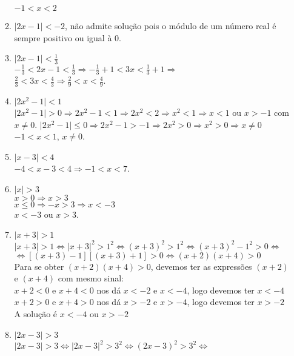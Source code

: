 \documentclass[10pt]{book}
\begin{document}
\begin{enumerate}
\begin{enumerate}
		$-1 < x < 2$
		\item %
		$\vert 2x - 1 \vert < -2$, não admite solução pois o módulo de um número real é sempre positivo ou igual à 0.
		\item %
		$\vert 2x - 1 \vert < \frac{1}{3}$\\
		$-\frac{1}{3} < 2x - 1 < \frac{1}{3} \Rightarrow -\frac{1}{3} + 1 < 3x < \frac{1}{3} + 1 \Rightarrow$\\
		$\frac{2}{3} < 3x < \frac{4}{3} \Rightarrow \frac{2}{9} < x < \frac{4}{9}$.
		\item %
		$\vert 2x^2 - 1 \vert < 1$\\
		$\vert 2x^2 - 1 \vert > 0 \Rightarrow 2x^2 - 1 < 1 \Rightarrow 2x^2 < 2 \Rightarrow x^2 < 1 \Rightarrow x < 1$ ou $x > -1$ com $x \neq 0$.
		$\vert 2x^2 - 1 \vert \leq 0 \Rightarrow 2x^2 - 1 > -1 \Rightarrow 2x^2 > 0 \Rightarrow x^2 > 0 \Rightarrow x \neq 0$\\
		$-1 < x < 1$, $x \neq 0$.
		\item %
		$\vert x - 3 \vert < 4$\\
		$-4 <  x - 3 < 4 \Rightarrow -1 < x < 7$.
		\item %
		$\vert x \vert > 3$\\		
		$x > 0 \Rightarrow x > 3$\\
		$x \leq 0 \Rightarrow -x > 3 \Rightarrow x < -3$\\
		$x < -3$ ou $x > 3$.
		\item %
		$\vert x + 3 \vert > 1$\\
		$\vert x + 3 \vert > 1 \Leftrightarrow \vert x + 3\vert^2 > 1^2  \Leftrightarrow (x+3)^2 > 1^2 \Leftrightarrow (x+3)^2 - 1^2 > 0 \Leftrightarrow$\\
		$\Leftrightarrow [(x+3)-1][(x+3)+1]>0 \Leftrightarrow (x+2)(x+4)>0$\\
		Para se obter $(x+2)(x+4)>0$, devemos ter as expressões $(x+2)$ e $(x+4)$ com mesmo sinal:\\
		$x+2 < 0$ e $ x+4 < 0 $ nos dá $x < -2$ e $x < -4$, logo devemos ter $x < -4$\\
		$x+2 > 0$ e $ x+4 > 0 $ nos dá $x > -2$ e $x > -4$, logo devemos ter $x > -2$\\
		A solução é $x < -4$ ou $x > -2$
		\item %
		$\vert 2x - 3 \vert > 3$\\
		$\vert 2x - 3 \vert > 3 \Leftrightarrow \vert 2x - 3 \vert^2 > 3^2 \Leftrightarrow (2x - 3)^2 > 3^2 \Leftrightarrow $\\

\end{enumerate}
\end{enumerate}
\end{document}
